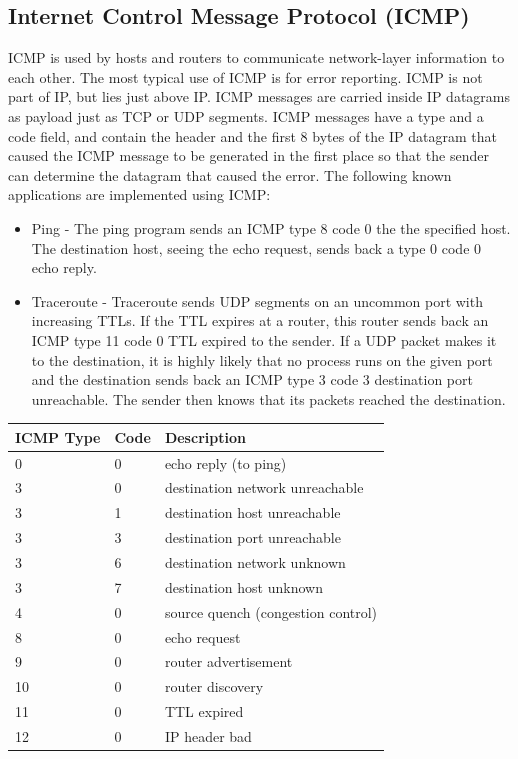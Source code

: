 \subsection{Internet Control Message Protocol (ICMP)}
ICMP is used by hosts and routers to communicate network-layer information to each other. The most typical use of ICMP is for error reporting. ICMP is not part of IP, but lies just above IP. ICMP messages are carried inside IP datagrams as payload just as TCP or UDP segments. ICMP messages have a type and a code field, and contain the header and the first 8 bytes of the IP datagram that caused the ICMP message to be generated in the first place so that the sender can determine the datagram that caused the error. The following known applications are implemented using ICMP:
\begin{itemize}
\item Ping - The ping program sends an ICMP type 8 code 0 the the specified host. The destination host, seeing the echo request, sends back a type 0 code 0 echo reply.
\item Traceroute - Traceroute sends UDP segments on an uncommon port with increasing TTLs. If the TTL expires at a router, this router sends back an ICMP type 11 code 0 TTL expired to the sender. If a UDP packet makes it to the destination, it is highly likely that no process runs on the given port and the destination sends back an ICMP type 3 code 3 destination port unreachable. The sender then knows that its packets reached the destination.
\end{itemize}
\renewcommand{\arraystretch}{1.4}
\begin{table}[H]
\centering
\begin{tabular}{lll}
\arrayrulecolor{NavyBlue}\hline
ICMP Type & Code & Description \\ \hline
\arrayrulecolor{black}
0 & 0 & echo reply (to ping) \\ \hline
3 & 0 & destination network unreachable \\ \hline
3 & 1 & destination host unreachable \\ \hline
3 & 3 & destination port unreachable \\ \hline
3 & 6 & destination network unknown \\ \hline
3 & 7 & destination host unknown \\ \hline
4 & 0 & source quench (congestion control) \\ \hline
8 & 0 & echo request \\ \hline
9 & 0 & router advertisement \\ \hline
10 & 0 & router discovery \\ \hline
11 & 0 & TTL expired \\ \hline
12 & 0 & IP header bad \\ \hline
\end{tabular}
\end{table}

